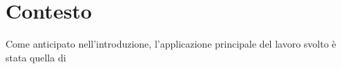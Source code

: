 \chapter{Contesto}

Come anticipato nell'introduzione, l'applicazione principale del lavoro svolto
è stata quella di